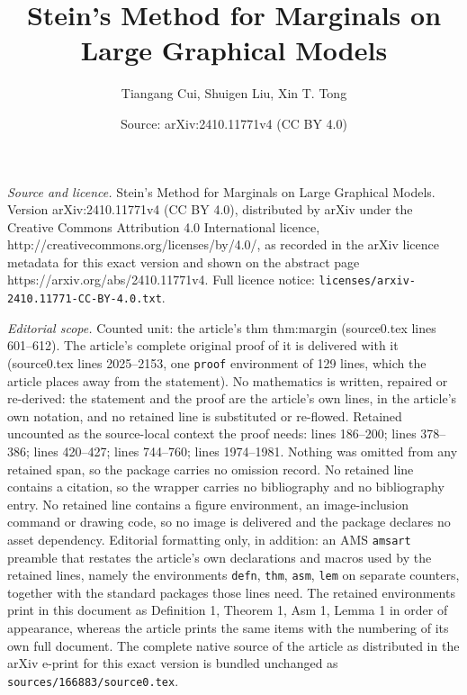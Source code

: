 \documentclass[10pt,a4paper]{amsart}
\title{Stein's Method for Marginals on Large Graphical Models}
\author{Tiangang Cui, Shuigen Liu, Xin T. Tong}
\date{Source: arXiv:2410.11771v4 (CC BY 4.0)}
\begin{document}
\maketitle

\noindent\emph{Source and licence.} Stein's Method for Marginals on Large Graphical Models. Version arXiv:2410.11771v4 (CC BY 4.0), distributed by arXiv under the Creative Commons Attribution 4.0 International licence, http://creativecommons.org/licenses/by/4.0/, as recorded in the arXiv licence metadata for this exact version and shown on the abstract page https://arxiv.org/abs/2410.11771v4. Full licence notice: \texttt{licenses/arxiv-2410.11771-CC-BY-4.0.txt}.\par\smallskip

\noindent\textit{Editorial scope.} Counted unit: the article's thm thm:margin (source0.tex lines 601--612). The article's complete original proof of it is delivered with it (source0.tex lines 2025--2153, one \texttt{proof} environment of 129 lines, which the article places away from the statement). No mathematics is written, repaired or re-derived: the statement and the proof are the article's own lines, in the article's own notation, and no retained line is substituted or re-flowed.  Retained uncounted as the source-local context the proof needs: lines 186--200; lines 378--386; lines 420--427; lines 744--760; lines 1974--1981.  Nothing was omitted from any retained span, so the package carries no omission record.  No retained line contains a citation, so the wrapper carries no bibliography and no bibliography entry.  No retained line contains a figure environment, an image-inclusion command or drawing code, so no image is delivered and the package declares no asset dependency.  Editorial formatting only, in addition: an AMS \texttt{amsart} preamble that restates the article's own declarations and macros used by the retained lines, namely the environments \texttt{defn}, \texttt{thm}, \texttt{asm}, \texttt{lem} on separate counters, together with the standard packages those lines need.  The retained environments print in this document as Definition 1, Theorem 1, Asm 1, Lemma 1 in order of appearance, whereas the article prints the same items with the numbering of its own full document.  The complete native source of the article as distributed in the arXiv e-print for this exact version is bundled unchanged as \texttt{sources/166883/source0.tex}.
\end{document}
